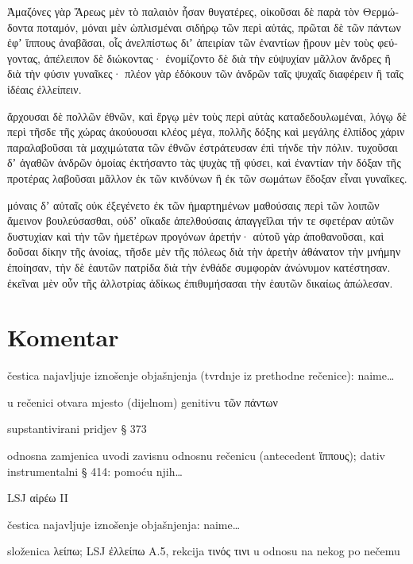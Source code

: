 {\large

\begin{greek}

\noindent Ἀμαζόνες γὰρ Ἄρεως μὲν τὸ παλαιὸν ἦσαν θυγατέρες, οἰκοῦσαι δὲ παρὰ τὸν Θερμώδοντα ποταμόν, μόναι μὲν ὡπλισμέναι σιδήρῳ τῶν περὶ αὐτάς, πρῶται δὲ τῶν πάντων ἐφʼ ἵππους ἀναβᾶσαι, οἷς ἀνελπίστως διʼ ἀπειρίαν τῶν ἐναντίων ᾕρουν μὲν τοὺς φεύγοντας, ἀπέλειπον δὲ διώκοντας· ἐνομίζοντο δὲ διὰ τὴν εὐψυχίαν μᾶλλον ἄνδρες ἢ διὰ τὴν φύσιν γυναῖκες· πλέον γὰρ ἐδόκουν τῶν ἀνδρῶν ταῖς ψυχαῖς διαφέρειν ἢ ταῖς ἰδέαις ἐλλείπειν.

ἄρχουσαι δὲ πολλῶν ἐθνῶν, καὶ ἔργῳ μὲν τοὺς περὶ αὐτὰς καταδεδουλωμέναι, λόγῳ δὲ περὶ τῆσδε τῆς χώρας ἀκούουσαι κλέος μέγα, πολλῆς δόξης καὶ μεγάλης ἐλπίδος χάριν παραλαβοῦσαι τὰ μαχιμώτατα τῶν ἐθνῶν ἐστράτευσαν ἐπὶ τήνδε τὴν πόλιν. τυχοῦσαι δʼ ἀγαθῶν ἀνδρῶν ὁμοίας ἐκτήσαντο τὰς ψυχὰς τῇ φύσει, καὶ ἐναντίαν τὴν δόξαν τῆς προτέρας λαβοῦσαι μᾶλλον ἐκ τῶν κινδύνων ἢ ἐκ τῶν σωμάτων ἔδοξαν εἶναι γυναῖκες.

μόναις δʼ αὐταῖς οὐκ ἐξεγένετο ἐκ τῶν ἡμαρτημένων μαθούσαις περὶ τῶν λοιπῶν ἄμεινον βουλεύσασθαι, οὐδʼ οἴκαδε ἀπελθούσαις ἀπαγγεῖλαι τήν τε σφετέραν αὐτῶν δυστυχίαν καὶ τὴν τῶν ἡμετέρων προγόνων ἀρετήν· αὐτοῦ γὰρ ἀποθανοῦσαι, καὶ δοῦσαι δίκην τῆς ἀνοίας, τῆσδε μὲν τῆς πόλεως διὰ τὴν ἀρετὴν ἀθάνατον τὴν μνήμην ἐποίησαν, τὴν δὲ ἑαυτῶν πατρίδα διὰ τὴν ἐνθάδε συμφορὰν ἀνώνυμον κατέστησαν. ἐκεῖναι μὲν οὖν τῆς ἀλλοτρίας ἀδίκως ἐπιθυμήσασαι τὴν ἑαυτῶν δικαίως ἀπώλεσαν.

\end{greek}

}

\newpage

\section*{Komentar}


\begin{description}[noitemsep]
\item[γὰρ] čestica najavljuje iznošenje objašnjenja (tvrdnje iz prethodne rečenice): naime\dots
\item[πρῶται] u rečenici otvara mjesto (dijelnom) genitivu τῶν πάντων
\item[τῶν πάντων] supstantivirani pridjev § 373
\item[οἷς] odnosna zamjenica uvodi zavisnu odnosnu rečenicu (antecedent ἵππους); dativ instrumentalni § 414: pomoću njih\dots
\item[ᾕρουν] LSJ αἱρέω II
\item[γὰρ] čestica najavljuje iznošenje objašnjenja: naime\dots
\item[ἐλλείπειν] složenica λείπω; LSJ ἐλλείπω A.5, rekcija τινός τινι u odnosu na nekog po nečemu
\end{description}

